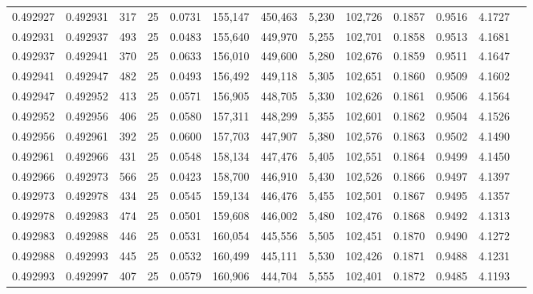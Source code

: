\begin{tabular}{rrrrrrrrrrrrr}
0.492927 & 0.492931 &   317 &  25 &                                     0.0731 & 155,147 & 450,463 &   5,230 & 102,726 & 0.1857 & 0.9516 & 4.1727 \\
0.492931 & 0.492937 &   493 &  25 &                                     0.0483 & 155,640 & 449,970 &   5,255 & 102,701 & 0.1858 & 0.9513 & 4.1681 \\
0.492937 & 0.492941 &   370 &  25 &                                     0.0633 & 156,010 & 449,600 &   5,280 & 102,676 & 0.1859 & 0.9511 & 4.1647 \\
0.492941 & 0.492947 &   482 &  25 &                                     0.0493 & 156,492 & 449,118 &   5,305 & 102,651 & 0.1860 & 0.9509 & 4.1602 \\
0.492947 & 0.492952 &   413 &  25 &                                     0.0571 & 156,905 & 448,705 &   5,330 & 102,626 & 0.1861 & 0.9506 & 4.1564 \\
0.492952 & 0.492956 &   406 &  25 &                                     0.0580 & 157,311 & 448,299 &   5,355 & 102,601 & 0.1862 & 0.9504 & 4.1526 \\
0.492956 & 0.492961 &   392 &  25 &                                     0.0600 & 157,703 & 447,907 &   5,380 & 102,576 & 0.1863 & 0.9502 & 4.1490 \\
0.492961 & 0.492966 &   431 &  25 &                                     0.0548 & 158,134 & 447,476 &   5,405 & 102,551 & 0.1864 & 0.9499 & 4.1450 \\
0.492966 & 0.492973 &   566 &  25 &                                     0.0423 & 158,700 & 446,910 &   5,430 & 102,526 & 0.1866 & 0.9497 & 4.1397 \\
0.492973 & 0.492978 &   434 &  25 &                                     0.0545 & 159,134 & 446,476 &   5,455 & 102,501 & 0.1867 & 0.9495 & 4.1357 \\
0.492978 & 0.492983 &   474 &  25 &                                     0.0501 & 159,608 & 446,002 &   5,480 & 102,476 & 0.1868 & 0.9492 & 4.1313 \\
0.492983 & 0.492988 &   446 &  25 &                                     0.0531 & 160,054 & 445,556 &   5,505 & 102,451 & 0.1870 & 0.9490 & 4.1272 \\
0.492988 & 0.492993 &   445 &  25 &                                     0.0532 & 160,499 & 445,111 &   5,530 & 102,426 & 0.1871 & 0.9488 & 4.1231 \\
0.492993 & 0.492997 &   407 &  25 &                                     0.0579 & 160,906 & 444,704 &   5,555 & 102,401 & 0.1872 & 0.9485 & 4.1193 \\

\end{tabular}
